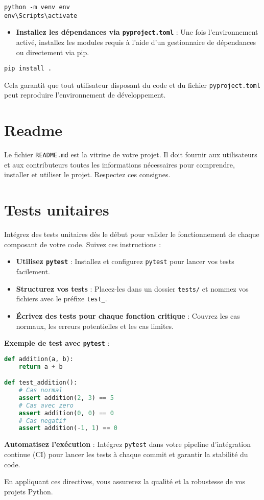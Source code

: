 \documentclass[a4paper,12pt]{article}
\begin{document}
\begin{lstlisting}
python -m venv env
env\Scripts\activate
\end{lstlisting}

\begin{itemize}
    \item \textbf{Installez les dépendances via \texttt{pyproject.toml}} : Une fois l'environnement activé, installez les modules requis à l'aide d'un gestionnaire de dépendances ou directement via pip.
\end{itemize}

\begin{lstlisting}
pip install .
\end{lstlisting}

Cela garantit que tout utilisateur disposant du code et du fichier \texttt{pyproject.toml} peut reproduire l'environnement de développement.

\section{Readme}

Le fichier \texttt{README.md} est la vitrine de votre projet. Il doit fournir aux utilisateurs et aux contributeurs toutes les informations nécessaires pour comprendre, installer et utiliser le projet. Respectez ces consignes.

\section{Tests unitaires}

Intégrez des tests unitaires dès le début pour valider le fonctionnement de chaque composant de votre code. Suivez ces instructions :

\begin{itemize}
    \item \textbf{Utilisez \texttt{pytest}} : Installez et configurez \texttt{pytest} pour lancer vos tests facilement.
    \item \textbf{Structurez vos tests} : Placez-les dans un dossier \texttt{tests/} et nommez vos fichiers avec le préfixe \texttt{test\_}.
    \item \textbf{Écrivez des tests pour chaque fonction critique} : Couvrez les cas normaux, les erreurs potentielles et les cas limites.
\end{itemize}

\textbf{Exemple de test avec \texttt{pytest}} :

\begin{lstlisting}[language=python]
def addition(a, b):
    return a + b

def test_addition():
    # Cas normal
    assert addition(2, 3) == 5
    # Cas avec zero
    assert addition(0, 0) == 0
    # Cas negatif
    assert addition(-1, 1) == 0
\end{lstlisting}

\textbf{Automatisez l'exécution} : Intégrez \texttt{pytest} dans votre pipeline d'intégration continue (CI) pour lancer les tests à chaque commit et garantir la stabilité du code.

En appliquant ces directives, vous assurerez la qualité et la robustesse de vos projets Python.
\end{document}
